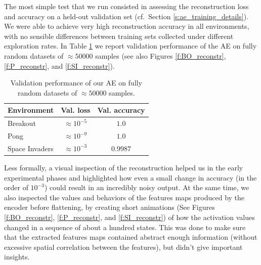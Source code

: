 The most simple test that we run consisted in assessing the reconstruction loss
and accuracy on a held-out validation set (cf.\ Section \ref{s:ae_training_details}). 
We were able to achieve very high reconstruction accuracy in all environments, 
with no sensible differences between training sets collected under different 
exploration rates. In Table \ref{t:ae_training_precision} we report validation 
performance of the AE on fully random datasets of $\approx50000$ samples (see
also Figures \ref{f:BO_reconstr}, \ref{f:P_reconstr}, and \ref{f:SI_reconstr}).
%
\begin{table}
    \centering
    \begin{tabular}{l c c} 
	\hline
	Environment    & Val. loss        & Val. accuracy \\ 
	\hline 
	Breakout       & $\approx10^{-5}$ & $1.0$ \\
	Pong           & $\approx10^{-9}$ & $1.0$ \\
	Space Invaders & $\approx10^{-3}$ & $0.9987$ \\
	\hline
    \end{tabular}
    \caption[AE validation performance]{Validation performance of our AE on
	     fully random datasets of $\approx50000$ samples.}
    \label{t:ae_training_precision}
\end{table}
%
Less formally, a visual inspection of the reconstruction helped us in the early 
experimental phases and highlighted how even a small change in accuracy (in the
order of $10^{-3}$) could result in an incredibly noisy output.
At the same time, we also inspected the values and behaviors of the features 
maps produced by the encoder before flattening, by creating short animations (See
Figures \ref{f:BO_reconstr}, \ref{f:P_reconstr}, and \ref{f:SI_reconstr}) of 
how the activation values changed in a sequence of about a hundred states. 
This was done to make sure that the extracted features maps contained abstract
enough information (without excessive spatial correlation between the features),
but didn't give important insights.

